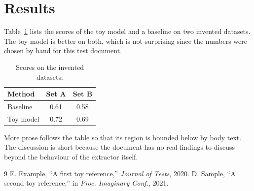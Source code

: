 \documentclass[twocolumn]{article}
\begin{document}
\section{Results}\label{sec:results}
Table~\ref{tab:res} lists the scores of the toy model and a baseline on two invented datasets. The toy model is better on both, which is not surprising since the numbers were chosen by hand for this test document.

\begin{table}[h]
\caption{Scores on the invented datasets.}
\label{tab:res}
\centering
\begin{tabular}{lcc}
\hline
Method & Set A & Set B \\
\hline
Baseline & 0.61 & 0.58 \\
Toy model & 0.72 & 0.69 \\
\hline
\end{tabular}
\end{table}

More prose follows the table so that its region is bounded below by body text. The discussion is short because the document has no real findings to discuss beyond the behaviour of the extractor itself.

\begin{thebibliography}{9}
 E. Example, ``A first toy reference,'' \emph{Journal of Tests}, 2020.
 D. Sample, ``A second toy reference,'' in \emph{Proc. Imaginary Conf.}, 2021.
\end{thebibliography}
\end{document}
